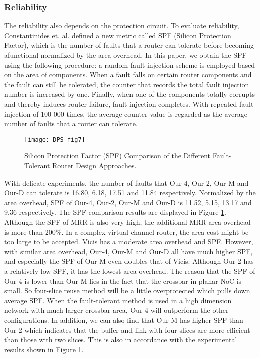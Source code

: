 \subsubsection{Reliability}
The reliability also depends on the protection circuit. To evaluate reliability, Constantinides et. al. \cite{constantinides2006bulletproof} defined a new metric called SPF (Silicon Protection Factor), which is the number of faults that a router can tolerate before becoming afunctional normalized by the area overhead. In this paper, we obtain the SPF using the following procedure: a random fault injection scheme is employed based on the area of components. When a fault falls on certain router components and the fault can still be tolerated, the counter that records the total fault injection number is increased by one. Finally, when one of the components totally corrupts and thereby induces router failure, fault injection completes. With repeated fault injection of 100 000 times, the average counter value is regarded as the average number of faults that a router can tolerate. 

\begin{figure}[h]
      \centering
        \texttt{[image: DPS-fig7]}
        \caption{Silicon Protection Factor (SPF) Comparison of the Different Fault-Tolerant Router Design Approaches.}
        \label{fig:dps-fig7}
\end{figure}


With delicate experiments, the number of faults that Our-4, Our-2, Our-M and Our-D can tolerate is 16.80, 6.18, 17.51 and 11.84 respectively. Normalized by the area overhead, SPF of Our-4, Our-2, Our-M and Our-D is 11.52, 5.15, 13.17 and 9.36 respectively. The SPF comparison results are displayed in Figure \ref{fig:dps-fig7}. Although the SPF of MRR is also very high, the additional MRR area overhead is more than 200\%. In a complex virtual channel router, the area cost might be too large to be accepted. Vicis has a moderate area overhead and SPF. However, with similar area overhead, Our-4, Our-M and Our-D all have much higher SPF, and especially the SPF of Our-M even doubles that of Vicis. Although Our-2 has a relatively low SPF, it has the lowest area overhead. The reason that the SPF of Our-4 is lower than Our-M lies in the fact that the crossbar in planar NoC is small. So four-slice reuse method will be a little overprotected which pulls down average SPF. When the fault-tolerant method is used in a high dimension network with much larger crossbar area, Our-4 will outperform the other configurations. In addition, we can also find that Our-M has higher SPF than Our-2 which indicates that the buffer and link with four slices are more efficient than those with two slices. This is also in accordance with the experimental results shown in Figure \ref{fig:dps-fig7}.

